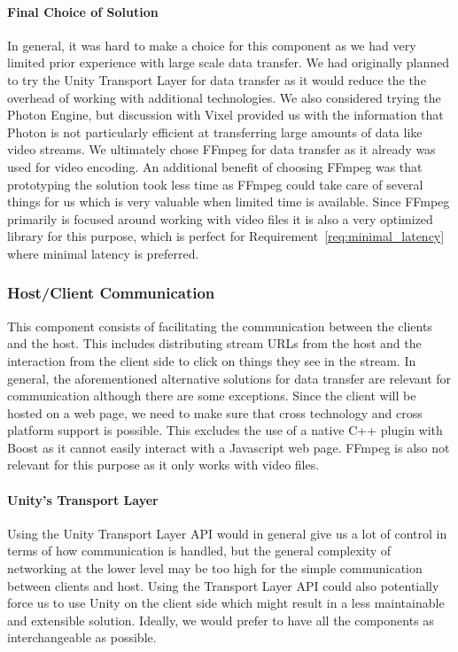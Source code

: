 \paragraph{Final Choice of Solution}
In general, it was hard to make a choice for this component as we had very limited prior experience with large scale data transfer. We had originally planned to try the Unity Transport Layer for data transfer as it would reduce the the overhead of working with additional technologies. We also considered trying the Photon Engine, but discussion with Vixel provided us with the information that Photon is not particularly efficient at transferring large amounts of data like video streams. We ultimately chose FFmpeg for data transfer as it already was used for video encoding. An additional benefit of choosing FFmpeg was that prototyping the solution took less time as FFmpeg could take care of several things for us which is very valuable when limited time is available. Since FFmpeg primarily is focused around working with video files it is also a very optimized library for this purpose, which is perfect for Requirement~\ref{req:minimal_latency} where minimal latency is preferred. 

\subsubsection{Host/Client Communication} %
This component consists of facilitating the communication between the clients and the host. This includes distributing stream URLs from the host and the interaction from the client side to click on things they see in the stream. In general, the aforementioned alternative solutions for data transfer are relevant for communication although there are some exceptions. Since the client will be hosted on a web page, we need to make sure that cross technology and cross platform support is possible. This excludes the use of a native C++ plugin with Boost as it cannot easily interact with a Javascript web page. FFmpeg is also not relevant for this purpose as it only works with video files.  
    
\paragraph{Unity's Transport Layer}
Using the Unity Transport Layer API would in general give us a lot of control in terms of how communication is handled, but the general complexity of networking at the lower level may be too high for the simple communication between clients and host. Using the Transport Layer API could also potentially force us to use Unity on the client side which might result in a less maintainable and extensible solution. Ideally, we would prefer to have all the components as interchangeable as possible. 
      
